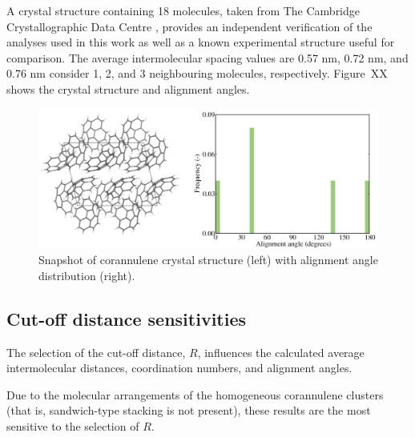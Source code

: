 A crystal structure containing 18 molecules, taken from The Cambridge Crystallographic Data Centre \cite{CORANN11unitcell}, provides an independent verification of the analyses used in this work as well as a known experimental structure useful for comparison. The average intermolecular spacing values are 0.57 nm, 0.72 nm, and 0.76 nm consider 1, 2, and 3 neighbouring molecules, respectively. Figure~XX shows the crystal structure and alignment angles.
%
\begin{figure}[!tbh]
\centering
\includegraphics[width=0.65\linewidth]{Figures/corannulene_crystal.eps}
\caption{Snapshot of corannulene crystal structure (left) with alignment angle distribution (right).}
\label{figSI:corannulene_crystal}
\end{figure}
%


\subsection{Cut-off distance sensitivities}
The selection of the cut-off distance, $R$, influences the calculated average intermolecular distances, coordination numbers, and alignment angles.

Due to the molecular arrangements of the homogeneous corannulene clusters (that is, sandwich-type stacking is not present), these results are the most sensitive to the selection of $R$.


